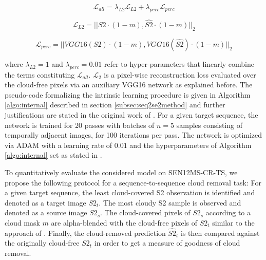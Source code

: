 \documentclass[journal]{IEEEtran}
\begin{document}
\begin{equation}
\label{eq:Lall_DIP}
\mathcal{L}_{all} = \lambda_{L2} \mathcal{L}_{L2} + \lambda_{perc} \mathcal{L}_{perc}
\end{equation}
\label{eq:Lall_seq2seq}

\begin{equation}
\label{eq:L2_DIP}
\mathcal{L}_{L2} = ||S2 \cdot (1-m), \hat{S2} \cdot (1-m)||_2
\end{equation}

\begin{equation}
\label{eq:Lperc_DIP}
\mathcal{L}_{perc} = ||VGG16(S2) \cdot (1-m), VGG16(\hat{S2}) \cdot (1-m)||_2
\end{equation}


where $\lambda_{L2} = 1$ and $\lambda_{perc} = 0.01$ refer to hyper-parameters that linearly combine the terms constituting $\mathcal{L}_{all}$. $\mathcal{L}_{2}$ is a pixel-wise reconstruction loss evaluated over the cloud-free pixels via an auxiliary VGG16 network \cite{Simonyan_Zisserman_2014} as explained before. The pseudo-code formalizing the intrinsic learning procedure is given in Algorithm \ref{algo:internal} described in section \ref{subsec:seq2se2method} and further justifications are stated in the original work of \cite{ulyanov2018deep}. For a given target sequence, the network is trained for 20 passes with batches of $n=5$ samples consisting of temporally adjacent images, for 100 iterations per pass. The network is optimized via ADAM \cite{kingma2014adam} with a learning rate of $0.01$  and the hyperparameters of Algorithm \ref{algo:internal} set as stated in \cite{zhang2019internal}.

To quantitatively evaluate the considered model on SEN12MS-CR-TS, we propose the following protocol for a sequence-to-sequence cloud removal task:
For a given target sequence, the least cloud-covered S2 observation is identified and denoted as a target image $S2_t$. The most cloudy S2 sample is observed and denoted as a source image $S2_s$. The cloud-covered pixels of $S2_s$ according to a cloud mask $m$ are alpha-blended with the cloud-free pixels of $S2_t$ similar to the approach of \cite{Rafique_Blanton_Jacobs}. Finally, the cloud-removed prediction $\hat{S2}_t$ is then compared against the originally cloud-free $S2_t$ in order to get a measure of goodness of cloud removal.
\end{document}
